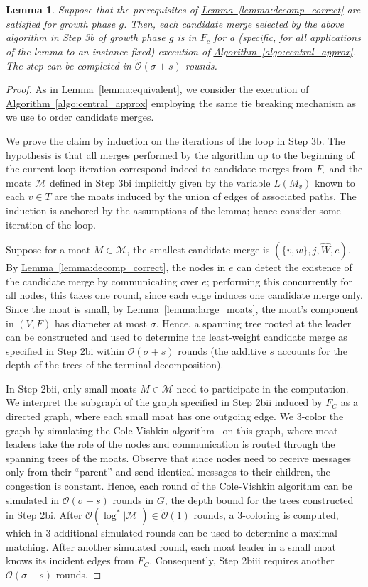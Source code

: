 \documentclass[letterpaper,11pt]{article}
\newtheorem{lemma}[theorem]{Lemma}
\newcommand{\namedref}[2]{\hyperref[#2]{#1~\ref*{#2}}}
\newcommand{\lemmaref}[1]{\namedref{Lemma}{#1}}
\newcommand{\algref}[1]{\namedref{Algorithm}{#1}}
\newcommand{\BO}{\mathcal{O}}
\newcommand{\sO}{\tilde{\mathcal{O}}}
\newcommand{\M}{\mathcal{M}}
\begin{document}
\begin{lemma}\label{lemma:growth_3b}
Suppose that the prerequisites of \lemmaref{lemma:decomp_correct} are satisfied
for growth phase $g$. Then, each candidate merge selected by the above
algorithm in Step 3b of growth phase $g$ is in $F_c$ for a (specific, for all
applications of the lemma to an instance fixed) execution of
\algref{algo:central_approx}. The step can be completed in $\sO(\sigma+s)$
rounds.
\end{lemma}
\begin{proof}As in \lemmaref{lemma:equivalent}, we consider the execution of
\algref{algo:central_approx} employing the same tie breaking mechanism as we use
to order candidate merges.

We prove the claim by induction on the iterations of the loop in Step 3b. The
hypothesis is that all merges performed by the algorithm up to the beginning of
the current loop iteration correspond indeed to candidate merges from $F_c$ and
the moats $\M$ defined in Step 3bi implicitly given by the variable $L(M_v)$
known to each $v\in T$ are the moats induced by the union of edges of associated
paths. The induction is anchored by the assumptions of the lemma; hence consider
some iteration of the loop.

Suppose for a moat $M\in \M$, the smallest candidate merge is
$(\{v,w\},j,\hat{W},e)$. By \lemmaref{lemma:decomp_correct}, the nodes in $e$
can detect the existence of the candidate merge by communicating over $e$;
performing this concurrently for all nodes, this takes one round, since each
edge induces one candidate merge only. Since the moat is small, by
\lemmaref{lemma:large_moats}, the moat's component in $(V,F)$ has diameter at
most $\sigma$. Hence, a spanning tree rooted at the leader can be constructed
and used to determine the least-weight candidate merge as specified in Step 2bi
within $\BO(\sigma+s)$ rounds (the additive $s$ accounts for the depth of the
trees of the terminal decomposition).

In Step 2bii, only small moats $M\in \M$ need to participate in the computation.
We interpret the subgraph of the graph specified in Step 2bii induced by $F_C$
as a directed graph, where each small moat has one outgoing edge. We $3$-color
the graph by simulating the Cole-Vishkin algorithm~\cite{CV-86} on this graph,
where moat leaders take the role of the nodes and communication is routed
through the spanning trees of the moats. Observe that since nodes need to
receive messages only from their ``parent'' and send identical messages to their
children, the congestion is constant. Hence, each round of the Cole-Vishkin
algorithm can be simulated in $\BO(\sigma+s)$ rounds in $G$, the depth bound for
the trees constructed in Step 2bi. After $\BO(\log^* |\M|)\in \sO(1)$ rounds, a
$3$-coloring is computed, which in $3$ additional simulated rounds can be used
to determine a maximal matching. After another simulated round, each moat
leader in a small moat knows its incident edges from $F_C$. Consequently, Step
2biii requires another $\BO(\sigma+s)$ rounds.


\end{proof}
\end{document}
